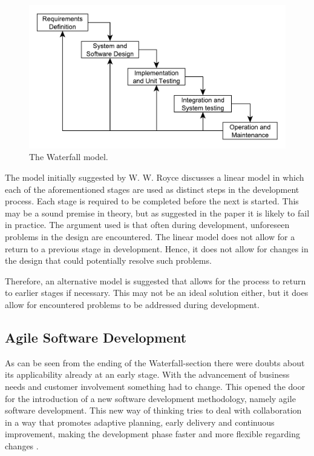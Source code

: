 \begin{figure}
\centering
\includegraphics[width=150mm]{images/chapters/development_models/waterfall.pdf}
\caption{The Waterfall model.}
\label{waterfall}
\end{figure}

The model initially suggested by W. W. Royce discusses a linear model in which each of the aforementioned stages are used as distinct steps in the development process. Each stage is required to be completed before the next is started. This may be a sound premise in theory, but as suggested in the paper it is likely to fail in practice. The argument used is that often during development, unforeseen problems in the design are encountered. The linear model does not allow for a return to a previous stage in development. Hence, it does not allow for changes in the design that could potentially resolve such problems.

Therefore, an alternative model is suggested that allows for the process to return to earlier stages if necessary. This may not be an ideal solution either, but it does allow for encountered problems to be addressed during development.

\subsection{Agile Software Development}

As can be seen from the ending of the Waterfall-section there were doubts about its applicability already at an early stage. With the advancement of business needs and customer involvement something had to change. This opened the door for the introduction of a new software development methodology, namely agile software development. This new way of thinking tries to deal with collaboration in a way that promotes adaptive planning, early delivery and continuous improvement, making the development phase faster and more flexible regarding changes \cite{abrahamsson2002}.

